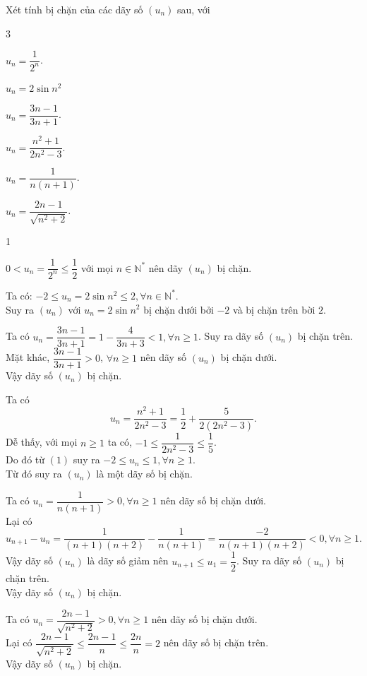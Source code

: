 \begin{vd}%
	Xét tính bị chặn của các dãy số $(u_n)$ sau, với
	\begin{enumEX}{3}
		\item $u_n=\dfrac{1}{2^n}$.
		\item $u_n=2\sin{n^2}$
		\item $u_n=\dfrac{3n-1}{3n+1}$.
		\item $u_n=\dfrac{n^2+1}{2n^2-3}$.
		\item $u_{n}=\dfrac{1}{n(n+1)}$.
		\item $u_n=\dfrac{2n-1}{\sqrt{n^2+2}}$.
	\end{enumEX}
	\loigiai
	{
		\begin{enumEX}{1}
			\item $0<u_n=\dfrac{1}{2^n}\leq\dfrac{1}{2}$ với mọi $n\in\mathbb{N}^*$ nên dãy $(u_n)$ bị chặn.
			\item Ta có: $-2 \leq u_n=2 \sin n^{2} \leq 2, \forall n \in \mathbb{N}^*$.\\
			Suy ra $(u_n)$ với $u_n=2 \sin n^2$ bị chặn dưới bởi $-2$ và bị chặn trên bời $2$.
			\item Ta có $u_n=\dfrac{3n-1}{3n+1}=1-\dfrac{4}{3n+3}<1, \forall n \geq 1$. Suy ra dãy số $(u_n)$ bị chặn trên.\\
			Mặt khác, $\dfrac{3n-1}{3n+1}>0$, $\forall n\geq 1$ nên dãy số $(u_n)$ bị chặn dưới.\\
			Vậy dãy số $(u_n)$ bị chặn.
			\item Ta có 
			\[u_n=\dfrac{n^2+1}{2n^2-3}=\dfrac{1}{2}+\dfrac{5}{2(2n^2-3)}\tag{1}.\]
			Dễ thấy, với mọi $n \geq 1$ ta có, $-1 \le \dfrac{1}{2n^2-3} \le \dfrac{1}{5}$.\\ Do đó từ $(1)$ suy ra $-2 \le u_n \le 1, \forall n \geq 1$.\\
			Từ đó suy ra $(u_n)$ là một dãy số bị chặn.
			\item Ta có $u_n=\dfrac{1}{n(n+1)}>0, \forall n \geq 1$ nên dãy số bị chặn dưới.\\
			Lại có
			\[u_{n+1}-u_n=\dfrac{1}{(n+1)(n+2)}-\dfrac{1}{n(n+1)}=\dfrac{-2}{n(n+1)(n+2)}<0, \forall n \geq 1.\]
			Vậy dãy số $(u_n)$ là dãy số giảm nên $u_{n+1}\le u_1=\dfrac{1}{2}$. Suy ra dãy số $(u_n)$ bị chặn trên.\\
			Vậy dãy số $(u_n)$ bị chặn.
			\item Ta có $u_n=\dfrac{2n-1}{\sqrt{n^2+2}}>0, \forall n \geq 1$ nên dãy số bị chặn dưới.\\
			Lại có $\dfrac{2n-1}{\sqrt{n^2+2}} \le \dfrac{2n-1}{n} \le \dfrac{2n}{n}=2$ nên dãy số bị chặn trên.\\
			Vậy dãy số $(u_n)$ bị chặn.
		\end{enumEX}	
	}
\end{vd}

